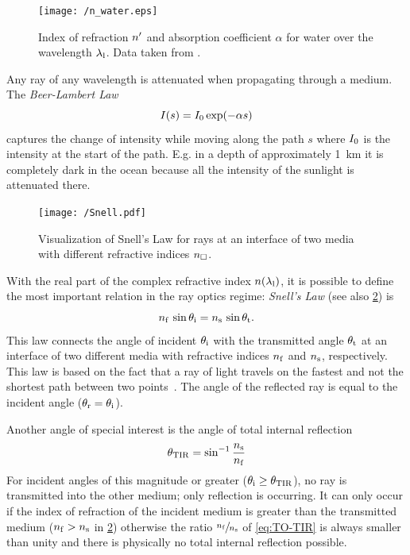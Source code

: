 \begin{figure}[tbp]
  \centering
  \texttt{[image: /n\_water.eps]}
  \caption{Index of refraction $n^{\prime}$ and absorption coefficient $\alpha$ for 
  water over the wavelength $\lambda_{\mathrm{l}}$. Data taken from 
\cite{Hale1973,Segelstein1981}.}
  \label{fig:TO-n_water}
\end{figure}


Any ray of any wavelength is attenuated when propagating through a medium. The 
\emph{Beer-Lambert Law}
\begin{equation}
  I(s) = I_{0}\exp(-\alpha s)
  \label{eq:TO-beer-lambert}
\end{equation}
captures the change of intensity while moving along the path $s$ where 
$I_{0}$ is the intensity at the start of the path. E.g. in a depth of 
approximately \SI{1}{\kilo\meter} it is completely dark in the ocean because 
all the intensity of the sunlight is attenuated there.

\begin{figure}[tbp]
  \centering
  \texttt{[image: /Snell.pdf]}
  \caption{Visualization of Snell's Law for rays at an interface of two media 
  with different refractive indices $n_{\Box}$.}
  \label{fig:TO-Snell}
\end{figure}

With the real part of the complex refractive index $n(\lambda_{\mathrm{l}})$, it is 
possible to define the most important relation in the ray optics regime: 
\emph{Snell's Law} (see also \cref{fig:TO-Snell}) is
\begin{equation}
  n_{\mathrm{f}}\,\sin\theta_{\mathrm{i}} = n_{\mathrm{s}}\,\sin\theta_{\mathrm{t}}.
  \label{eq:TO-Snell}
\end{equation}
This law connects the angle of incident $\theta_{\mathrm{i}}$ with the transmitted angle 
$\theta_{\mathrm{t}}$ at an interface of two different media with refractive indices 
$n_{\mathrm{f}}$ and $n_{\mathrm{s}}$, respectively. This law is based on the fact that a ray of 
light travels on the fastest and not the shortest path between two 
points~\cite{Born1980Ch3}. The angle of the reflected ray is equal to the 
incident angle ($\theta_{\mathrm{r}}=\theta_{\mathrm{i}}$).

Another angle of special interest is the angle of total internal reflection 
\begin{equation}
  \theta_{\mathrm{TIR}}=\sin^{-1} \frac{n_{\mathrm{s}}}{n_{\mathrm{f}}}
  \label{eq:TO-TIR}
\end{equation}
For incident angles of this magnitude or greater 
($\theta_{\mathrm{i}}\geq\theta_{\mathrm{TIR}}$), no ray is transmitted into the other 
medium; only reflection is occurring. It can only occur if the index of 
refraction of the incident medium is greater than the transmitted medium 
($n_{\mathrm{f}}>n_{\mathrm{s}}$ in \cref{fig:TO-Snell}) otherwise the ratio $\sfrac{n_{\mathrm{f}}}{n_{\mathrm{s}}}$ of 
\cref{eq:TO-TIR} is always smaller than unity and there is physically no total 
internal reflection possible.

